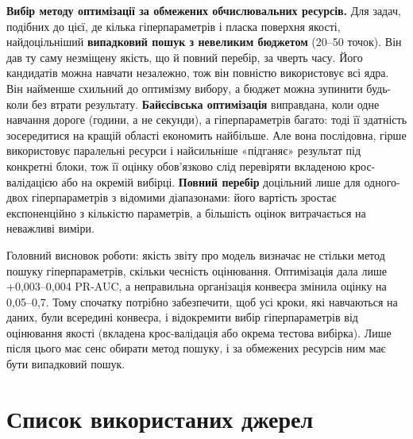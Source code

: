 \documentclass[14pt,a4paper]{extreport}
\begin{document}
\textbf{Вибір методу оптимізації за обмежених обчислювальних ресурсів.} Для задач, подібних до цієї, де кілька гіперпараметрів і пласка поверхня якості, найдоцільніший \textbf{випадковий пошук з невеликим бюджетом} (20--50 точок). Він дав ту саму незміщену якість, що й повний перебір, за чверть часу. Його кандидатів можна навчати незалежно, тож він повністю використовує всі ядра. Він найменше схильний до оптимізму вибору, а бюджет можна зупинити будь-коли без втрати результату. \textbf{Байєсівська оптимізація} виправдана, коли одне навчання дороге (години, а не секунди), а гіперпараметрів багато: тоді її здатність зосередитися на кращій області економить найбільше. Але вона послідовна, гірше використовує паралельні ресурси і найсильніше «підганяє» результат під конкретні блоки, тож її оцінку обов'язково слід перевіряти вкладеною крос-валідацією або на окремій вибірці. \textbf{Повний перебір} доцільний лише для одного-двох гіперпараметрів з відомими діапазонами: його вартість зростає експоненційно з кількістю параметрів, а більшість оцінок витрачається на неважливі виміри.

Головний висновок роботи: якість звіту про модель визначає не стільки метод пошуку гіперпараметрів, скільки чесність оцінювання. Оптимізація дала лише +0,003--0,004 PR-AUC, а неправильна організація конвеєра змінила оцінку на 0,05--0,7. Тому спочатку потрібно забезпечити, щоб усі кроки, які навчаються на даних, були всередині конвеєра, і відокремити вибір гіперпараметрів від оцінювання якості (вкладена крос-валідація або окрема тестова вибірка). Лише після цього має сенс обирати метод пошуку, і за обмежених ресурсів ним має бути випадковий пошук.

\section*{Список використаних джерел}
\end{document}
